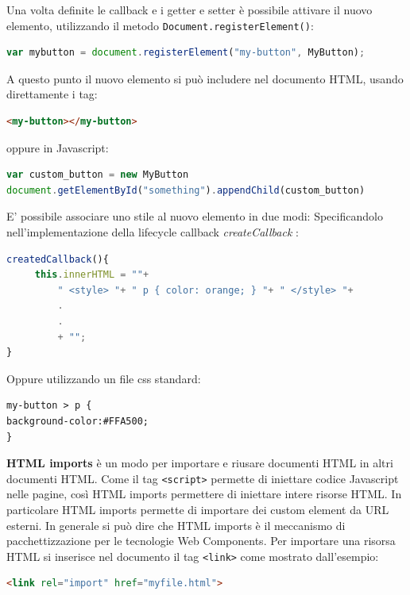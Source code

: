 Una volta definite le callback e i getter e setter è possibile attivare il nuovo elemento, utilizzando il metodo \texttt{Document.registerElement()}:
\begin{lstlisting}[language=javascript]
var mybutton = document.registerElement("my-button", MyButton);
\end{lstlisting}
A questo punto il nuovo elemento si può includere nel documento HTML, usando direttamente i tag:
\begin{lstlisting}[language=html]
<my-button></my-button>
\end{lstlisting}
oppure in Javascript:
\begin{lstlisting}[language=javascript]
var custom_button = new MyButton
document.getElementById("something").appendChild(custom_button)
\end{lstlisting}
E’ possibile associare uno stile al nuovo elemento in due modi:
Specificandolo nell’implementazione della lifecycle callback \emph{createCallback} :
\begin{lstlisting}[language=javascript]
createdCallback(){ 
     this.innerHTML = ""+ 
         " <style> "+ " p { color: orange; } "+ " </style> "+ 
         .
         .
         + "";
}
\end{lstlisting}
Oppure utilizzando un file css standard:
\begin{lstlisting}[language=html]
my-button > p { 
background-color:#FFA500;
}
\end{lstlisting}

\textbf{HTML imports} è un modo per importare e riusare documenti HTML in altri documenti HTML. Come il tag \texttt{<script>} permette di iniettare codice Javascript nelle pagine, così HTML imports permettere di iniettare intere risorse HTML. In particolare HTML imports permette di importare dei custom element da URL esterni. In generale si può dire che HTML imports è il meccanismo di pacchettizzazione per le tecnologie Web Components.
Per importare una risorsa HTML si inserisce nel documento il tag \texttt{<link>} come mostrato dall’esempio:
\begin{lstlisting}[language=html]
<link rel="import" href="myfile.html">
\end{lstlisting}

